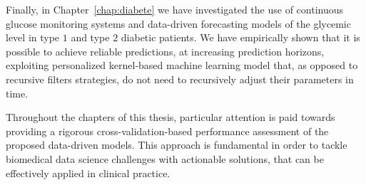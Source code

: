Finally, in Chapter~\ref{chap:diabete} we have investigated the use of continuous glucose monitoring systems and data-driven forecasting models of the glycemic level in type $1$ and type $2$ diabetic patients.
We have empirically shown that it is possible to achieve reliable predictions, at increasing prediction horizons, exploiting personalized kernel-based machine learning model that, as opposed to recursive filters strategies, do not need to recursively adjust their parameters in time.

Throughout the chapters of this thesis, particular attention is paid towards providing a rigorous cross-validation-based performance assessment of the proposed data-driven models. This approach is fundamental in order to tackle biomedical data science challenges with actionable solutions, that can be effectively applied in clinical practice.
